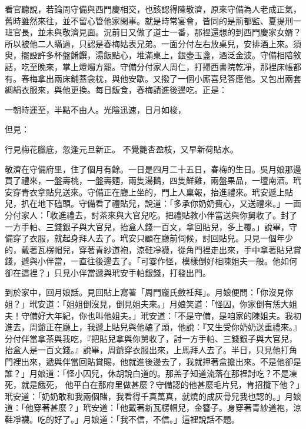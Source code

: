 \begin{showcontents}{}
看官聽說，若論周守備與西門慶相交，也該認得陳敬濟，原來守備為人老成正氣，舊時雖然來往，並不留心管他家閑事。就是時常宴會，皆同的是荊都監、夏提刑一班官長，並未與敬濟見面。況前日又做了道士一番，那裡還想的到西門慶家女婿？所以被他二人瞞過，只認是春梅姑表兄弟。一面分付左右放桌兒，安排酒上來。須臾，擺設許多杯盤餚饌，湯飯點心，堆滿桌上，銀壺玉盞，酒泛金波。守備相陪敘話，吃至晚來，掌上燈燭方罷。守備分付家人周仁，打掃西書院乾凈，那裡床帳都有。春梅拿出兩床鋪蓋衾枕，與他安歇。又撥了一個小廝喜兒答應他。又包出兩套綢絹衣服來，與他更換。每日飯食，春梅請進後邊吃。正是：

一朝時運至，半點不由人。光陰迅速，日月如梭，

但見：

行見梅花臘底，忽逢元旦新正。
不覺艷杏盈枝，又早新荷貼水。

敬濟在守備府里，住了個月有餘。一日是四月二十五日，春梅的生日。吳月娘那邊買了禮來，一盤壽桃，一盤壽麵，兩隻湯鵝，四隻鮮雞，兩盤果品，一壇南酒。玳安穿青衣拿貼兒送來。守備正在廳上坐的，門上人稟報，抬進禮來。玳安遞上貼兒，扒在地下磕頭。守備看了禮貼兒，說道：「多承你奶奶費心，又送禮來。」一面分付家人：「收進禮去，討茶來與大官兒吃。把禮貼教小伴當送與你舅收了。封了一方手帕、三錢銀子與大官兒，抬盒人錢一百文，拿回貼兒，多上覆。」說畢，守備穿了衣服，就起身拜人去了。玳安只顧在廳前伺候，討回貼兒。只見一個年少的，戴著瓦楞帽兒，穿著青紗道袍，涼鞋凈襪，從角門裡走出來，手中拿著貼兒賞錢，遞與小伴當，一直往後邊去了。「可霎作怪，模樣倒好相陳姐夫一般。他如何卻在這裡？」只見小伴當遞與玳安手帕銀錢，打發出門。

到於家中，回月娘話。見回貼上寫著「周門龐氏斂衽拜」。月娘便問：「你沒見你姐？」玳安道：「姐姐倒沒見，倒見姐夫來。」月娘笑道：「怪囚，你家倒有恁大姐夫！守備好大年紀，你也叫他姐夫。」玳安道：「不是守備，是咱家的陳姐夫。我初進去，周爺正在廳上，我遞上貼兒與他磕了頭，他說：『又生受你奶奶送重禮來。』分付伴當拿茶與我吃，『把貼兒拿與你舅收了，討一方手帕、三錢銀子與大官兒，抬盒人是一百文錢。』說畢，周爺穿衣服出來，上馬拜人去了。半日，只見他打角門裡出來，遞與伴當回貼賞賜，他就進後邊去了，我就押著盒擔出來。不是他卻是誰？」月娘道：「怪小囚兒，休胡說白道的。那羔子知道流落在那裡討吃？不是凍死，就是餓死，
他平白在那府里做甚麼？守備認的他甚麼毛片兒，肯招攬下他？」玳安道：「奶奶敢和我兩個賭，我看得千真萬真，就燒的成灰骨兒我也認的。」月娘道：「他穿著甚麼？」玳安道：「他戴著新瓦楞帽兒，金簪子。身穿著青紗道袍，涼鞋凈襪。吃的好了。」月娘道：「我不信，不信。」這裡說話不題。


\end{showcontents}
